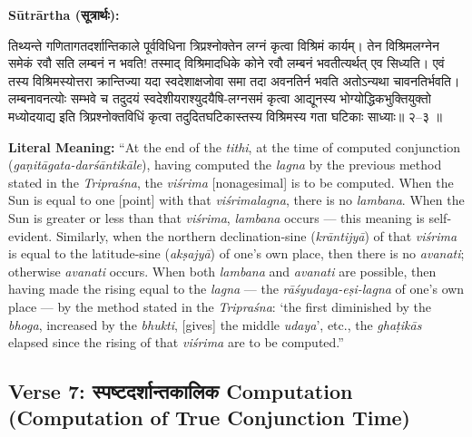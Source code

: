 \documentclass[11pt,a4paper]{article}
\newcommand{\dev}[1]{{\devanagarifont #1}}
\newenvironment{sanskritverse}{%
  \begin{center}\begin{minipage}{0.95\textwidth}
  \setlength{\leftskip}{1em}
  \setlength{\rightskip}{1em}
  \dev
}{\end{minipage}\end{center}}
\newenvironment{paracol}[1]{\begingroup}{\endgroup}
\newcommand{\switchcolumn}[1][]{%
  \ifnum#1=0\relax\else\par\nobreak\vspace{0.5em}\par\nobreak\fi%
}
\begin{document}
\begin{paracol}{2}

\noindent\textbf{Sūtrārtha (\dev{सूत्रार्थः}):}
\begin{sanskritverse}
तिथ्यन्ते गणितागतदर्शान्तिकाले पूर्वविधिना त्रिप्रश्नोक्तेन लग्नं कृत्वा विश्रिमं
कार्यम्। तेन विश्रिमलग्नेन समेकं रवौ सति लम्बनं न भवति! तस्माद् विश्रिमादधिके
कोने रवौ लम्बनं भवतीत्यर्थत् एव सिध्यति। एवं तस्य विश्रिमस्योत्तरा क्रान्तिज्या यदा
स्वदेशाक्षजोवा समा तदा अवनतिर्न भवति अतोऽन्यथा चावनतिर्भवति।
लम्बनावनत्योः सम्भवे च तदुदयं स्वदेशीयराश्युदयैषि-लग्नसमं कृत्वा
आद्यूनस्य भोग्योद्धिकभुक्तियुक्तो मध्योदयाद्य इति त्रिप्रश्नोक्तविधिं कृत्वा
तदुदितघटिकास्तस्य विश्रिमस्य गता घटिकाः साध्याः॥ २--३ ॥
\end{sanskritverse}

\switchcolumn

\textbf{Literal Meaning:} ``At the end of the \textit{tithi}, at the time of computed conjunction (\textit{gaṇitāgata-darśāntikāle}), having computed the \textit{lagna} by the previous method stated in the \textit{Tripraśna}, the \textit{viśrima} [nonagesimal] is to be computed. When the Sun is equal to one [point] with that \textit{viśrimalagna}, there is no \textit{lambana}. When the Sun is greater or less than that \textit{viśrima}, \textit{lambana} occurs --- this meaning is self-evident. Similarly, when the northern declination-sine (\textit{krāntijyā}) of that \textit{viśrima} is equal to the latitude-sine (\textit{akṣajyā}) of one's own place, then there is no \textit{avanati}; otherwise \textit{avanati} occurs. When both \textit{lambana} and \textit{avanati} are possible, then having made the rising equal to the \textit{lagna} --- the \textit{rāśyudaya-eṣi-lagna} of one's own place --- by the method stated in the \textit{Tripraśna}: `the first diminished by the \textit{bhoga}, increased by the \textit{bhukti}, [gives] the middle \textit{udaya}', etc., the \textit{ghaṭikās} elapsed since the rising of that \textit{viśrima} are to be computed.''

\end{paracol}

\subsection{Verse 7: {\devanagarifont स्पष्टदर्शान्तकालिक} Computation (Computation of True Conjunction Time)}
\end{document}

